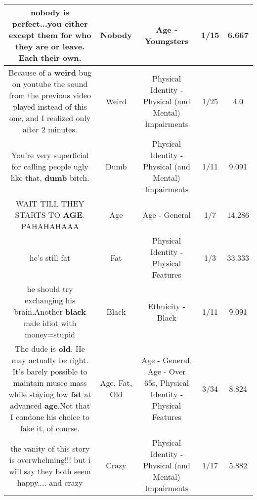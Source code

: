\documentclass[11pt]{article}
\newlength\mylength
\begin{document}
\begin{center}
\begin{longtable}{|C{.65\mylength}|C{.30\mylength}|C{.12\mylength}|C{.12\mylength}|C{.12\mylength}|}
  \small nobody is perfect...you either except them for who they are or leave. Each their own.\normalsize   & Nobody & Age - Youngsters & 1/15 & 6.667 \\  \hline
  \small Because of a \textbf{weird} bug on youtube the sound from the previous video played instead of this one, and I realized only after 2 minutes.\normalsize   & Weird & Physical Identity - Physical (and Mental) Impairments & 1/25 & 4.0 \\  \hline
  \small You're very superficial for calling people ugly like that, \textbf{dumb} bitch.\normalsize   & Dumb & Physical Identity - Physical (and Mental) Impairments & 1/11 & 9.091 \\  \hline
  \small WAIT TILL THEY STARTS TO \textbf{AGE}. PAHAHAHAAA\normalsize   & Age & Age - General & 1/7 & 14.286 \\  \hline
  \small he's still fat\normalsize   & Fat & Physical Identity - Physical Features & 1/3 & 33.333 \\  \hline
  \small he should try exchanging his brain.Another \textbf{black} male idiot with money=stupid\normalsize   & Black & Ethnicity - Black & 1/11 & 9.091 \\  \hline
  \small The dude is \textbf{old}. He may actually be right. It's barely possible to maintain musce mass while staying low \textbf{fat} at advanced \textbf{age}.Not that I condone his choice to fake it, of course.\normalsize   & Age, Fat, Old & Age - General, Age - Over 65s, Physical Identity - Physical Features & 3/34 & 8.824 \\  \hline
  \small the vanity of this story is overwhelming!!! but i will say they both seem happy.... and crazy\normalsize   & Crazy & Physical Identity - Physical (and Mental) Impairments & 1/17 & 5.882 \\  \hline

\end{longtable}
\end{center}
\end{document}
